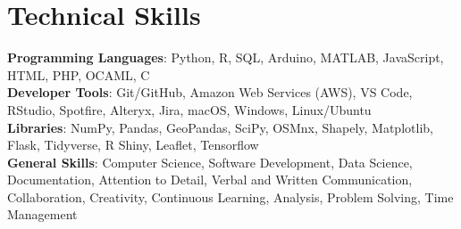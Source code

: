 \documentclass[letterpaper,10pt]{article}
\begin{document}
%
\section{Technical Skills}
 \begin{itemize}[leftmargin=0.15in, label={}]
    \small{\item{
     \textbf{Programming Languages}{: Python, R, SQL, Arduino, MATLAB, JavaScript, HTML, PHP, OCAML, C} \\
     \textbf{Developer Tools}{: Git/GitHub, Amazon Web Services (AWS), VS Code, RStudio, Spotfire, Alteryx, Jira, macOS, Windows, Linux/Ubuntu} \\
     \textbf{Libraries}{: NumPy, Pandas, GeoPandas, SciPy, OSMnx, Shapely, Matplotlib, Flask, Tidyverse, R Shiny, Leaflet, Tensorflow} \\
     \textbf{General Skills}{: Computer Science, Software Development, Data Science, Documentation, Attention to Detail, Verbal and Written Communication, Collaboration, Creativity, Continuous Learning, Analysis, Problem Solving, Time Management
    }}}
 \end{itemize}


\end{document}
